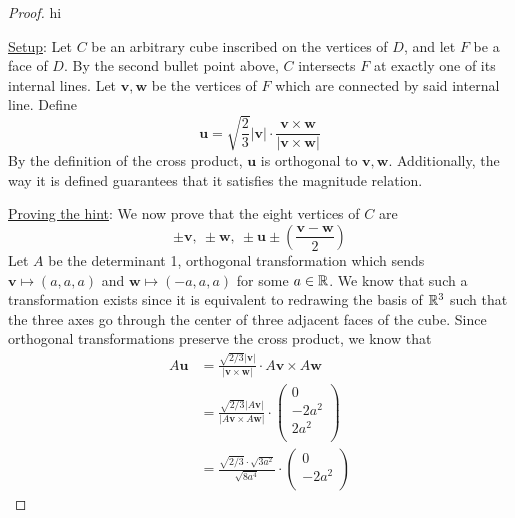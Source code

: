 \documentclass[../psets.tex]{subfiles}
\begin{document}
\begin{enumerate}
\begin{enumerate}
\begin{proof}
            {\color{white}hi}\par
            \underline{Setup}: Let $C$ be an arbitrary cube inscribed on the vertices of $D$, and let $F$ be a face of $D$. By the second bullet point above, $C$ intersects $F$ at exactly one of its internal lines. Let $\mathbf{v},\mathbf{w}$ be the vertices of $F$ which are connected by said internal line. Define
            \begin{equation*}
                \mathbf{u} = \sqrt{\frac{2}{3}}|\mathbf{v}|\cdot\frac{\mathbf{v}\times\mathbf{w}}{|\mathbf{v}\times\mathbf{w}|}
            \end{equation*}
            By the definition of the cross product, $\mathbf{u}$ is orthogonal to $\mathbf{v},\mathbf{w}$. Additionally, the way it is defined guarantees that it satisfies the magnitude relation.\par\smallskip
            \underline{Proving the hint}: We now prove that the eight vertices of $C$ are
            \begin{equation*}
                \pm\mathbf{v},\ \pm\mathbf{w},\ \pm\mathbf{u}\pm\left( \frac{\mathbf{v}-\mathbf{w}}{2} \right)
            \end{equation*}
            Let $A$ be the determinant 1, orthogonal transformation which sends $\mathbf{v}\mapsto(a,a,a)$ and $\mathbf{w}\mapsto(-a,a,a)$ for some $a\in\mathbb{R}$. We know that such a transformation exists since it is equivalent to redrawing the basis of $\mathbb{R}^3$ such that the three axes go through the center of three adjacent faces of the cube. Since orthogonal transformations preserve the cross product, we know that
            \begin{align*}
                A\mathbf{u} &= \frac{\sqrt{2/3}|\mathbf{v}|}{|\mathbf{v}\times\mathbf{w}|}\cdot A\mathbf{v}\times A\mathbf{w}\\
                &= \frac{\sqrt{2/3}|A\mathbf{v}|}{|A\mathbf{v}\times A\mathbf{w}|}\cdot
                \begin{pmatrix}
                    0\\
                    -2a^2\\
                    2a^2\\
                \end{pmatrix}\\
                &= \frac{\sqrt{2/3}\cdot\sqrt{3a^2}}{\sqrt{8a^4}}\cdot
                \begin{pmatrix}
                    0\\
                    -2a^2\\

\end{pmatrix}
\end{align*}
\end{proof}
\end{enumerate}
\end{enumerate}
\end{document}
